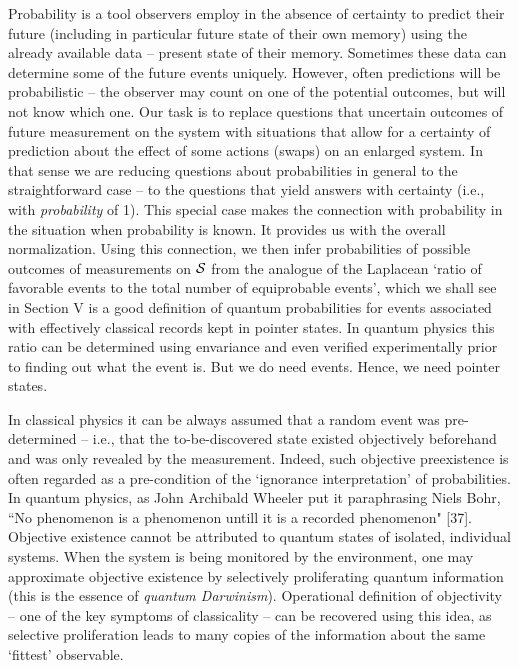 \documentclass[aps,twocolumn,pra,epsfig]{revtex4}
\begin{document}
Probability is a tool observers employ in the absence of certainty to predict
their future (including in particular future state of their own memory) using
the already available data -- present state of their memory. Sometimes these
data can determine some of the future events uniquely. However, often
predictions will be probabilistic -- the observer may count on one of
the potential outcomes, but will not know which one. Our task is to replace
questions that uncertain outcomes of future measurement on the system
with situations that allow for a certainty of prediction about the effect of
some actions (swaps) on an enlarged system. In that sense we are reducing 
questions about probabilities in general to the straightforward case -- to the
questions that yield answers with certainty (i.e., with {\it probability} of 1). This special
case makes the connection with probability in the situation when probability 
is known. It provides us with the overall normalization. Using this connection,
we then infer probabilities of possible outcomes of measurements on ${\cal S}$ 
from the analogue of the Laplacean `ratio of favorable events to the total number 
of equiprobable events', which we shall see in Section V is a good definition of 
quantum probabilities for events associated with effectively classical records 
kept in pointer states. In quantum physics this ratio can be determined using 
envariance and even verified experimentally prior to finding out what the event is. 
But we do need events. Hence, we need pointer states.

In classical physics it can be always assumed that a random event was
pre-determined -- i.e., that the to-be-discovered state existed objectively
beforehand and was only revealed by the measurement. Indeed, such objective
preexistence is often regarded as a pre-condition of the `ignorance
interpretation' of probabilities. In quantum physics, as John Archibald Wheeler
put it paraphrasing Niels Bohr, ``No phenomenon is a phenomenon untill it is
a recorded phenomenon" [37]. Objective existence cannot be attributed 
to quantum states of isolated, individual systems. When the system is being 
monitored by the environment, one may approximate objective existence 
by selectively proliferating quantum information (this is the essence of 
{\it quantum Darwinism}). Operational definition of objectivity -- one of the key
symptoms of classicality -- can be recovered using this idea, as selective
proliferation leads to many copies of the information about the same
`fittest' observable.
\end{document}
